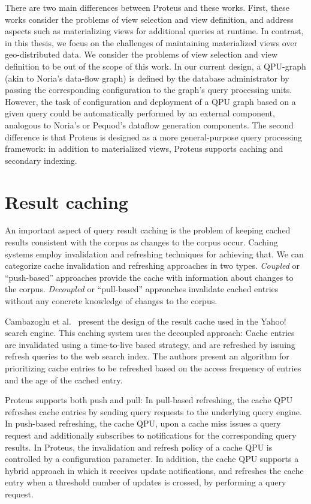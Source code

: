 There are two main differences between Proteus and these works.
First, these works consider the problems of view selection and view definition,
and address aspects such as materializing views for additional queries at runtime.
In contrast, in this thesis, we focus on the challenges of maintaining materialized views over geo-distributed data.
We consider the problems of view selection and view definition to be out of the scope of this work.
In our current design, a QPU-graph (akin to Noria's data-flow graph) is defined by the database administrator by passing
the corresponding configuration to the graph's query processing units.
However, the task of configuration and deployment of a QPU graph based on a given query could be automatically performed
by an external component, analogous to Noria's or Pequod's dataflow generation components.
The second difference is that Proteus is designed as a more general-purpose query processing framework:
in addition to materialized views, Proteus supports caching and secondary indexing.

\section{Result caching}
\label{sec:related_caching}
An important aspect of query result caching is the problem of keeping cached results consistent with the corpus
as changes to the corpus occur.
Caching systems employ invalidation and refreshing techniques for achieving that.
We can categorize cache invalidation and refreshing approaches in two types.
\textit{Coupled} or ``push-based'' approaches provide the cache with information about changes to the corpus.
\textit{Decoupled} or ``pull-based'' approaches invalidate cached entries without any concrete knowledge of changes to the corpus.

Cambazoglu et al.\ \cite{cambazoglu:yahoorefreshing} present the design of the result cache used
in the Yahoo! search engine.
This caching system uses the decoupled approach:
Cache entries are invalidated using a time-to-live based strategy,
and are refreshed by issuing refresh queries to the web search index.
The authors present an algorithm for prioritizing cache entries to be refreshed based on the access frequency of entries and
the age of the cached entry.

Proteus supports both push and pull:
In pull-based refreshing, the cache QPU refreshes cache entries by sending query requests to the underlying query engine.
In push-based refreshing, the cache QPU, upon a cache miss issues a query request and additionally subscribes to
notifications for the corresponding query results.
In Proteus, the invalidation and refresh policy of a cache QPU is controlled by a configuration parameter.
In addition, the cache QPU supports a hybrid approach in which it receives update notifications,
and refreshes the cache entry when a threshold number of updates is crossed,
by performing a query request.


